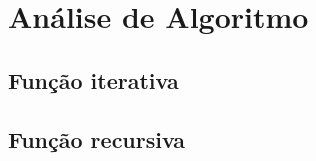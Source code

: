 \chapter{Análise de Algoritmo}
\label{ch:anal_de_alg} %

\section{Função iterativa}

\section{Função recursiva}





